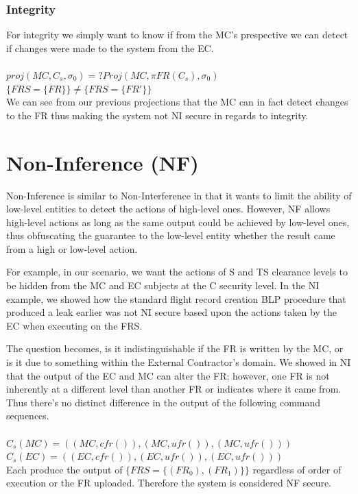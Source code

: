 \documentclass[10pt,journal,compsoc]{IEEEtran}
\begin{document}
\subsubsection{Integrity}

For integrity we simply want to know if from the MC's prespective we can detect if changes were made to the system from the EC. \\\\
$proj(MC, C_s, \sigma_0) =? Proj(MC, \pi FR(C_s), \sigma_0)$\\
$\{FRS = \{FR\}\} \neq \{FRS = \{FR'\}\}$\\

We can see from our previous projections that the MC can in fact detect changes to the FR thus making the system not NI secure in regards to integrity. 

\section{Non-Inference (NF)}

Non-Inference is similar to Non-Interference in that it wants to limit the ability of low-level entities to detect the actions of high-level ones. However, NF allows high-level actions as long as the same output could be achieved by low-level ones, thus obfuscating the guarantee to the low-level entity whether the result came from a high or low-level action. 

For example, in our scenario, we want the actions of S and TS clearance levels to be hidden from the MC and EC subjects at the C security level. In the NI example, we showed how the standard flight record creation BLP procedure that produced a leak earlier was not NI secure based upon the actions taken by the EC when executing on the FRS. 

The question becomes, is it indistinguishable if the FR is written by the MC, or is it due to something within the External Contractor's domain. We showed in NI that the output of the EC and MC can alter the FR; however, one FR is not inherently at a different level than another FR or indicates where it came from. Thus there's no distinct difference in the output of the following command sequences.\\\\
$C_s(MC)=((MC, cfr()), (MC, ufr()), (MC, ufr()))$\\
$C_s(EC)=((EC, cfr()), (EC, ufr()), (EC, ufr()))$\\

Each produce the output of $\{FRS = \{(FR_0),(FR_1)\}\}$ regardless of order of execution or the FR uploaded. Therefore the system is considered NF secure. 
\end{document}
